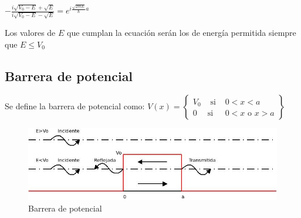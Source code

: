 \documentclass[oneside]{book}
\numberwithin{equation}{section}
\numberwithin{figure}{section}
\numberwithin{table}{section}
\begin{document}
				\begin{center}
					$\displaystyle -\frac{i\sqrt{V_0-E}+\sqrt{E}}{i\sqrt{V_0-E}-\sqrt{E}}=e^{i\frac{\sqrt{2mE}}{\hbar}a}$
				\end{center}
				\begin{center}
					Los valores de $E$ que cumplan la ecuación serán los de energía permitida siempre que $E \leq V_0$
				\end{center}	
				
				\subsection{Barrera de potencial}		
				
					Se define la barrera de potencial como: $\displaystyle V(x)=\begin{Bmatrix} V_0 & \mbox{ si }& 0<x<a \\ 0 & \mbox{si}& 0<x \text{ o } x>a \end{Bmatrix}$\\
				
				\begin{figure}[H]
					\begin{center}
						\includegraphics[scale=0.7]{Barrera.jpeg}
						\caption{Barrera de potencial}
					\end{center}
				\end{figure}		
							
\end{document}
